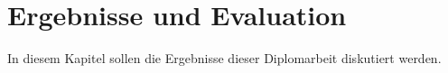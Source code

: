 \chapter{Ergebnisse und Evaluation}
In diesem Kapitel sollen die Ergebnisse dieser Diplomarbeit diskutiert werden. 



